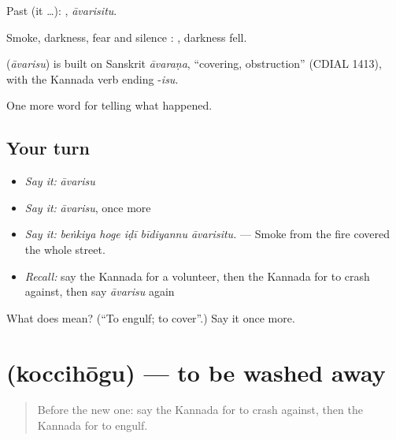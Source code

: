 Past (it …): , \emph{āvarisitu}.

Smoke, darkness, fear and silence :  , darkness fell.

\begin{cousinweb}
\textbf{} (\emph{āvarisu}) is built on Sanskrit \emph{āvaraṇa}, \textquotedblleft{}covering, obstruction\textquotedblright{} (CDIAL 1413), with the Kannada verb ending -\emph{isu}.
\end{cousinweb}

\begin{grammarlens}[title={What you've built}]
One more word for telling what happened.
\end{grammarlens}

\subsection*{Your turn}
\begin{itemize}
\raggedright
  \item \emph{Say it:} \emph{āvarisu}
  \item \emph{Say it:} \emph{āvarisu}, once more
  \item \emph{Say it:} \emph{beṅkiya hoge iḍī bīdiyannu āvarisitu.} — Smoke from the fire covered the whole street.
  \item \emph{Recall:} say the Kannada for a volunteer, then the Kannada for to crash against, then say \emph{āvarisu} again
\end{itemize}

\begin{tcolorbox}[breakable,colback=teal!4,colframe=teal!35!black,title={Before you move on}]
What does  mean? (\textquotedblleft{}To engulf; to cover\textquotedblright{}.) Say it once more.
\end{tcolorbox}
\section[\texorpdfstring{\kn{ಕೊಚ್ಚಿಹೋಗು} (koccihōgu)}{ಕೊಚ್ಚಿಹೋಗು (koccihōgu)}]{ (koccihōgu) — to be washed away}

\label{lesson:KA-C351-koccihogu}



\begin{quote}
Before the new one: say the Kannada for to crash against, then the Kannada for to engulf.
\end{quote}

